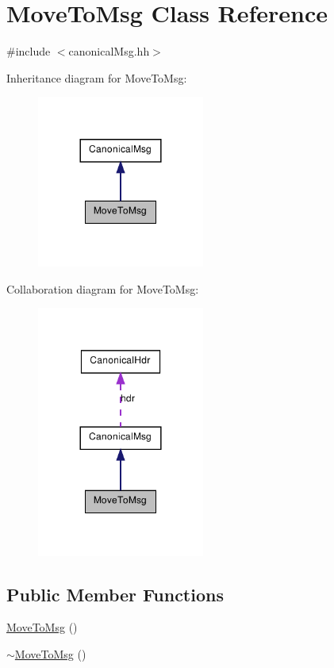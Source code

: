 \hypertarget{class_move_to_msg}{
\section{MoveToMsg Class Reference}
\label{class_move_to_msg}
}


{\ttfamily \#include $<$canonicalMsg.hh$>$}



Inheritance diagram for MoveToMsg:\nopagebreak
\begin{figure}[H]
\begin{center}
\leavevmode
\includegraphics[width=156pt]{class_move_to_msg__inherit__graph}
\end{center}
\end{figure}


Collaboration diagram for MoveToMsg:\nopagebreak
\begin{figure}[H]
\begin{center}
\leavevmode
\includegraphics[width=156pt]{class_move_to_msg__coll__graph}
\end{center}
\end{figure}
\subsection*{Public Member Functions}
\begin{DoxyCompactItemize}
\item 
\hyperlink{class_move_to_msg_ad5b4f8eb4268edcb0a625529f5784e4a}{MoveToMsg} ()
\item 
\hyperlink{class_move_to_msg_a906d8df43cff3edd365e3049047e4732}{$\sim$MoveToMsg} ()
\end{DoxyCompactItemize}


